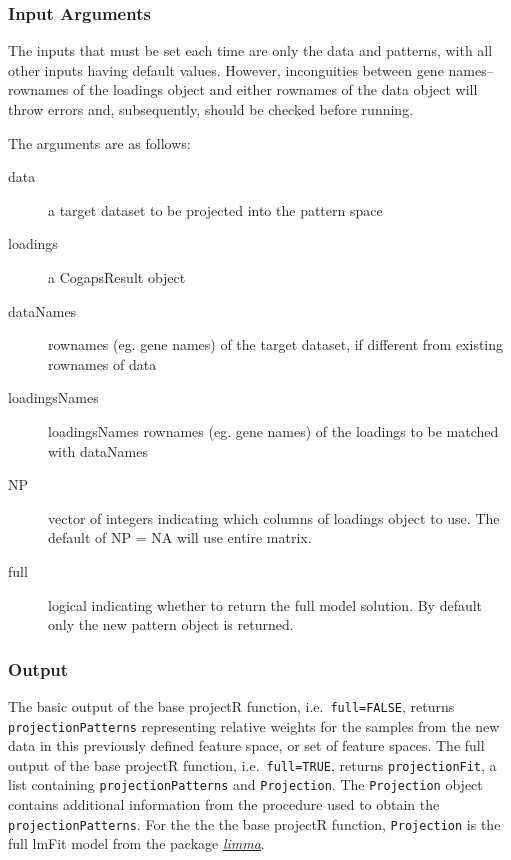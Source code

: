\documentclass[]{article}
\begin{document}
\hypertarget{input-arguments-1}{%
\subsubsection{Input Arguments}\label{input-arguments-1}}

The inputs that must be set each time are only the data and patterns, with all other inputs having default values. However, inconguities between gene names--rownames of the loadings object and either rownames of the data object will throw errors and, subsequently, should be checked before running.

The arguments are as follows:

\begin{description}
\item[data]{a target dataset to be projected into the pattern space}
\item[loadings]{a CogapsResult object}
\item[dataNames]{rownames (eg. gene names) of the target dataset, if different from existing rownames of data}
\item[loadingsNames] loadingsNames rownames (eg. gene names) of the loadings to be matched with dataNames
\item[NP]{vector of integers indicating which columns of loadings object to use. The default of NP = NA will use entire matrix.}
\item[full]{logical indicating whether to return the full model solution. By default only the new pattern object is returned.}
\end{description}

\hypertarget{output-1}{%
\subsubsection{Output}\label{output-1}}

The basic output of the base projectR function, i.e.~\texttt{full=FALSE}, returns \texttt{projectionPatterns} representing relative weights for the samples from the new data in this previously defined feature space, or set of feature spaces. The full output of the base projectR function, i.e.~\texttt{full=TRUE}, returns \texttt{projectionFit}, a list containing \texttt{projectionPatterns} and \texttt{Projection}. The \texttt{Projection} object contains additional information from the procedure used to obtain the \texttt{projectionPatterns}. For the the the base projectR function, \texttt{Projection} is the full lmFit model from the package \emph{\href{https://bioconductor.org/packages/3.12/limma}{limma}}.
\end{document}
